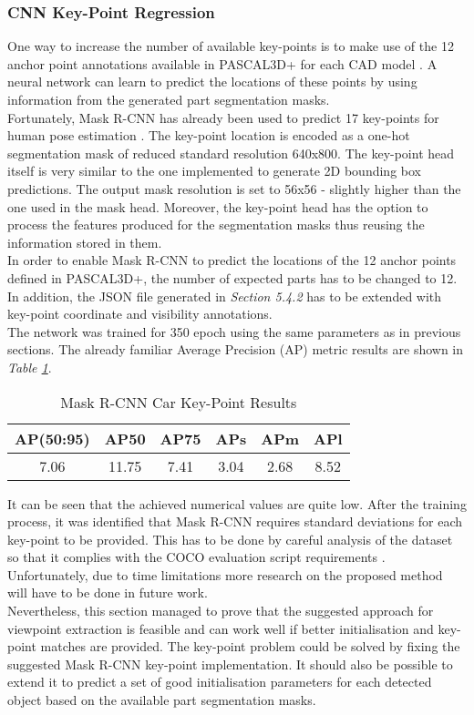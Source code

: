 \documentclass[main.tex]{subfiles}
\begin{document}
\subsubsection{CNN Key-Point Regression}
One way to increase the number of available key-points is to make use of the 12 anchor point annotations available in PASCAL3D+ for each CAD model \cite{Xiang2014}. A neural network can learn to predict the locations of these points by using information from the generated part segmentation masks. \\
\indent Fortunately, Mask R-CNN has already been used to predict 17 key-points for human pose estimation \cite{He2017}. The key-point location is encoded as a one-hot segmentation mask of reduced standard resolution 640x800. The key-point head itself is very similar to the one implemented to generate 2D bounding box predictions. The output mask resolution is set to 56x56 - slightly higher than the one used in the mask head. Moreover, the key-point head has the option to process the features produced for the segmentation masks thus reusing the information stored in them.\\
\indent In order to enable Mask R-CNN to predict the locations of the 12 anchor points defined in PASCAL3D+, the number of expected parts has to be changed to 12. In addition, the JSON file generated in \emph{Section 5.4.2} has to be extended with key-point coordinate and visibility annotations.\\
\indent The network was trained for 350 epoch using the same parameters as in previous sections. The already familiar Average Precision (AP) metric results are shown in \emph{Table \ref{tab:maskkey}}.
\begin{table}[H]
	\centering
	\begin{tabular}{| c | c | c | c | c | c |}
		\hline 
  		AP(50:95) & AP50 & AP75 & APs & APm & APl  \\
  		\hline
   		7.06 & 11.75 & 7.41 & 3.04 & 2.68 & 8.52 \\
		\hline
	\end{tabular}	
\caption{Mask R-CNN Car Key-Point Results}
\label{tab:maskkey}
\end{table}
\indent It can be seen that the achieved numerical values are quite low. After the training process, it was identified that Mask R-CNN requires standard deviations for each key-point to be provided. This has to be done by careful analysis of the dataset so that it complies with the COCO evaluation script requirements \cite{cocoeval}. Unfortunately, due to time limitations more research on the proposed method will have to be done in future work. \\
\indent Nevertheless, this section managed to prove that the suggested approach for viewpoint extraction is feasible and can work well if better initialisation and key-point matches are provided. The key-point problem could be solved by fixing the suggested Mask R-CNN key-point implementation. It should also be possible to extend it to predict a set of good initialisation parameters for each detected object based on the available part segmentation masks.
\end{document}
